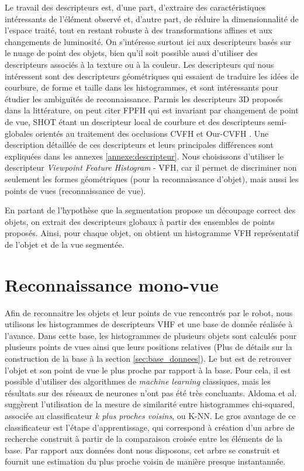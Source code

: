 Le travail des descripteurs est, d'une part, d'extraire des caractéristiques intéressants de l'élément observé et, d'autre part, de réduire la
dimensionnalité de l'espace traité, tout en restant robuste à des transformations affines et aux changements de luminosité. On s'intéresse surtout ici aux descripteurs basés sur le nuage de point des objets, bien qu'il soit possible aussi d'utiliser des descripteurs associés à la texture ou à la couleur. Les descripteurs qui nous intéressent sont des descripteurs géométriques qui essaient de traduire les idées de courbure, de forme et taille dans les histogrammes, et sont intéressants pour étudier les ambiguïtés de reconnaissance. Parmis les descripteurs 3D proposés dans la littérature, on peut citer FPFH \cite{rusu2009fast} qui est invariant par changement de point de vue, SHOT \cite{tombari2010unique} étant un descripteur local de courbure et des descripteurs semi-globales orientés au traitement des occlusions CVFH \cite{aldoma2011cad} et Our-CVFH \cite{aldoma2012our}. Une description détaillée de ces descripteurs et leurs principales différences sont expliquées dans les annexes \ref{annexe:descripteur}. Nous choisissons d'utiliser le descripteur \textit{Viewpoint Feature Histogram} - VFH, car il permet de discriminer non seulement les formes géométriques (pour la reconnaissance d'objet), mais aussi les points de vues (reconnaissance de vue).

En partant de l'hypothèse que la segmentation propose un découpage correct des objets, on extrait des descripteurs globaux à partir des ensembles de points proposés. Ainsi, pour chaque objet, on obtient un histogramme VFH représentatif de l'objet et de la vue segmentée.

\section {Reconnaissance mono-vue} 
\label{sec:rec_mono}

Afin de reconnaitre les objets et leur points de vue rencontrés par le robot, nous utilisons les histogrammes de descripteurs VHF et une base de donnée réalisée à l'avance. Dans cette base, les histogrammes de plusieurs objets sont calculés pour plusieurs points de vues ainsi que leurs positions relatives (Plus de détails sur la construction de la base à la section \ref{sec:base_donnees}). Le but est de retrouver l'objet et son point de vue le plus proche par rapport à la base. Pour cela, il est possible d'utiliser des algorithmes de \textit{machine learning} classiques, mais les résultats sur des réseaux de neurones n'ont pas été très concluants. Aldoma et al. \cite{Aldoma2012} suggèrent l'utilisation de la mesure de similarité entre histogrammes chi-squared, associée au classificateur \textit{k plus proches voisins}, ou K-NN. Le gros avantage de ce classificateur est l'étape d’apprentissage, qui correspond à création d’un arbre de recherche construit à partir de la comparaison croisée entre les éléments de la base. Par rapport aux données dont nous disposons, cet arbre se construit et fournit une estimation du plus proche voisin de manière presque instantannée.

